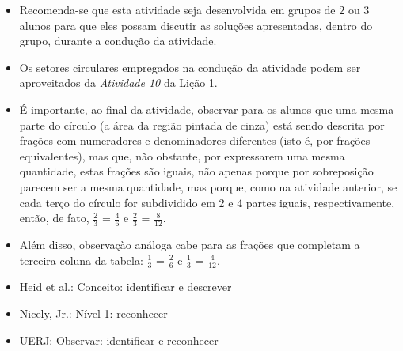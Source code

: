 \begin{itemize} %
    \item       Recomenda-se que esta atividade seja desenvolvida em grupos de
    $2$       ou       $3$       alunos para que eles possam discutir as
soluções apresentadas, dentro do grupo, durante a condução da atividade.
    \item       Os setores circulares empregados na condução da atividade podem
ser aproveitados da \emph{Atividade 10}       da Lição 1.
    \item       É importante, ao final da atividade, observar para os alunos que
uma mesma parte do círculo (a área da região pintada de cinza) está sendo
descrita por frações com numeradores e denominadores diferentes (isto é, por
frações equivalentes), mas que, não obstante, por expressarem uma mesma
quantidade, estas frações são iguais, não apenas porque por sobreposição parecem
ser a mesma quantidade, mas porque, como na atividade anterior, se cada terço do
círculo for subdividido em 2 e 4 partes iguais, respectivamente, então, de fato,
      $\frac{2}{3}$       =       $\frac{4}{6}$       e       $\frac{2}{3}$
 =       $\frac{8}{12}$.
    \item       Além disso, observaçào análoga cabe para as frações que
completam a terceira coluna da tabela:       $\frac{1}{3}$       =
$\frac{2}{6}$       e       $\frac{1}{3}$       =       $\frac{4}{12}$.
\end{itemize} %

   \vspace{.1cm}

 \vspace{.1cm}

\begin{itemize} %
    \item       Heid et al.: Conceito: identificar e descrever
    \item       Nicely, Jr.: Nível 1: reconhecer
    \item       UERJ: Observar: identificar e reconhecer
\end{itemize} %

